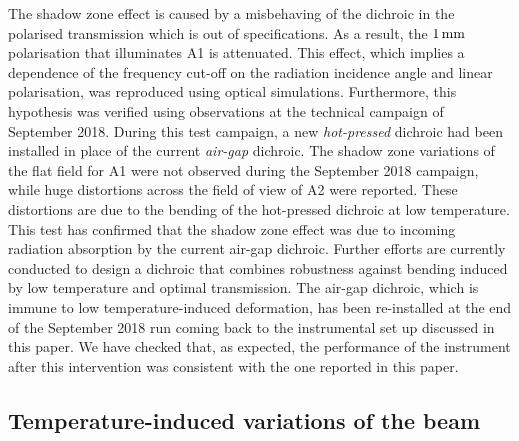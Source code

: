 The shadow zone effect is caused by {\lp a misbehaving of the dichroic in
the polarised transmission which is out of specifications. As a
result, the $1\,\rm{mm}$ polarisation that illuminates A1 is
attenuated.}
This effect,
which implies %
{\lp a dependence of the frequency cut-off on the radiation
incidence angle and linear polarisation,}
was reproduced using optical simulations. Furthermore, this hypothesis was
verified using observations at the technical campaign of September
2018. During this test campaign, a new \emph{hot-pressed} dichroic had
been installed in place of the current \emph{air-gap} dichroic.
%
%
The shadow zone variations of the flat field for A1 were
not observed during the September 2018 campaign, while huge distortions
across the field of view of A2 were reported. These distortions are
due to the bending of the hot-pressed dichroic at low temperature.
This test has confirmed that the shadow zone effect was due
to incoming radiation absorption by the current air-gap dichroic.
Further efforts are currently conducted to design a dichroic that
combines robustness against bending induced by low temperature and
optimal transmission.
{\lp The air-gap dichroic, which is immune to low temperature-induced
deformation, has been re-installed at the end of the September 2018
run coming back to the instrumental set up discussed in this paper. We
have checked that, as expected, the performance of the instrument
after this intervention was consistent with the one reported in this
paper.}




\subsection{Temperature-induced variations of the beam}
\label{se:beam_variation}

